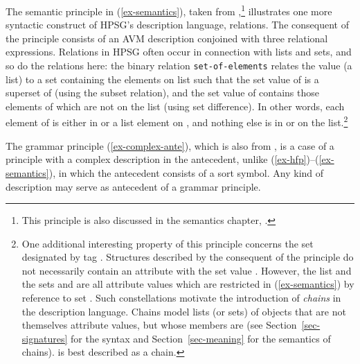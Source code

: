\documentclass[output=paper,biblatex,babelshorthands,newtxmath,draftmode,colorlinks,citecolor=brown]{langscibook}
\begin{document}
{The semantic principle in (\ref{ex-semantics}), taken
from ,\footnote{This principle is also discussed
in the semantics chapter, \crossrefchapterw[\page \pageref{sign-cons}]{semantics}.}
illustrates one more syntactic
construct of HPSG's description language, relations. The consequent of
the principle consists of an AVM description conjoined with three
relational expressions.  Relations in HPSG often occur in
connection with lists and sets, and so do the relations here: the
binary relation \texttt{set-of-elements} relates the  value
(a list) to a set  containing the elements on list  such
that the set value  of  is a superset of 
(using the subset relation), and the set value  of 
contains those elements of  which are not on the
 list (using set difference). In other words,
each element of  is either in \mbox{} or
a list element on , and nothing else is in 
or on the  list.\footnote{One
  additional interesting property of this principle concerns the set
  designated by tag . Structures described by the consequent of
  the principle do not necessarily contain an attribute with the set
  value . However, the list  and the sets  and  are
  all attribute values which are restricted in (\ref{ex-semantics}) by reference to set
  . Such constellations motivate the introduction of
  \emph{chains} in the description language. Chains model lists (or
  sets) of objects that are not themselves attribute values, but whose
  members are (see Section~\ref{sec-signatures} for the syntax and
  Section~\ref{sec-meaning} for the semantics of chains).  is best
  described as a chain.}

The grammar principle (\ref{ex-complex-ante}), which is also from
, is a case of a principle
with a complex description in the antecedent,
unlike (\ref{ex-hfp})--(\ref{ex-semantics}), in which the antecedent
consists of a sort symbol. Any kind of description
may serve as antecedent of a grammar principle.

}
\end{document}
